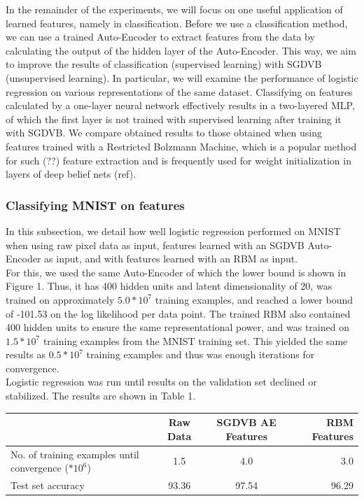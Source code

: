 \documentclass{article}
\begin{document}
In the remainder of the experiments, we will focus on one useful application of learned features, namely in classification. Before we use a classification method, we can use a trained Auto-Encoder to extract features from the data by calculating the output of the hidden layer of the Auto-Encoder. This way, we aim to improve the results of classification (supervised learning) with SGDVB (unsupervised learning). In particular, we will examine the performance of logistic regression on various representations of the same dataset. Classifying on features calculated by a one-layer neural network effectively results in a two-layered MLP, of which the first layer is not trained with supervised learning after training it with SGDVB. We compare obtained results to those obtained when using features trained with a Restricted Bolzmann Machine, which is a popular method for such (??) feature extraction and is frequently used for weight initialization in layers of deep belief nets (ref).

\subsubsection{Classifying MNIST on features}

In this subsection, we detail how well logistic regression performed on MNIST when using raw pixel data as input, features learned with an SGDVB Auto-Encoder as input, and with features learned with an RBM as input. \\ For this, we used the same Auto-Encoder of which the lower bound is shown in Figure 1. Thus, it has 400 hidden units and latent dimensionality of 20, was trained on approximately $5.0*10^7$ training examples, and reached a lower bound of -101.53 on the log likelihood per data point. The trained RBM also contained 400 hidden units to ensure the same representational power, and was trained on $1.5*10^7$ training examples from the MNIST training set. This yielded the same results as $0.5*10^7$ training examples and thus was enough iterations for convergence.\\
Logistic regression was run until results on the validation set declined or stabilized. The results are shown in Table 1.

\begin{table}
\begin{tabular}{|l|c|c|r|}
\hline
& Raw Data & SGDVB AE Features & RBM Features \\ \hline
No. of training examples until convergence ($*10^6$) & 1.5 & 4.0 & 3.0 \\ \hline 
Test set accuracy & 93.36 & 97.54 & 96.29
\end{tabular}
\end{table}
\end{document}

